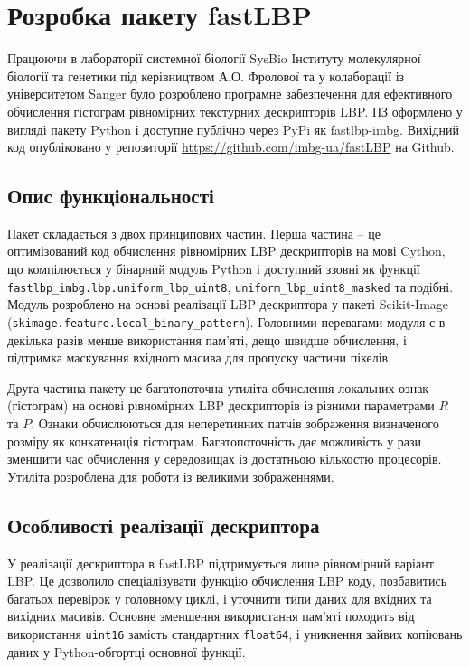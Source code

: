 \section{Розробка пакету fastLBP}\label{section2.2}

Працюючи в лабораторії системної біології SysBio Інституту молекулярної біології та генетики під керівництвом А.О. Фролової 
та у колаборації із університетом Sanger було розроблено програмне забезпечення для ефективного обчислення гістограм 
рівномірних текстурних дескрипторів LBP.
ПЗ оформлено у вигляді пакету Python і доступне публічно через PyPi як \href{https://pypi.org/project/fastlbp-imbg/}{fastlbp-imbg}.
Вихідний код опубліковано у репозиторії \url{https://github.com/imbg-ua/fastLBP} на Github.

\subsection{Опис функціональності}\label{section2.2a}
Пакет складається з двох принципових частин. 
Перша частина -- це оптимізований код обчислення рівномірних LBP дескрипторів на мові Cython, що компілюється у бінарний модуль Python 
і доступний ззовні як функції \verb|fastlbp_imbg.lbp.uniform_lbp_uint8|, \verb|uniform_lbp_uint8_masked| та подібні.
Модуль розроблено на основі реалізації LBP дескриптора у пакеті Scikit-Image (\verb|skimage.feature.local_binary_pattern|).
Головними перевагами модуля є в декілька разів менше використання пам'яті, дещо швидше обчислення, і підтримка маскування вхідного масива для 
пропуску частини пікелів.

Друга частина пакету це багатопоточна утиліта обчислення локальних ознак (гістограм) на основі рівномірних LBP дескрипторів із різними параметрами $R$ та $P$.
Ознаки обчислюються для неперетинних патчів зображення визначеного розміру як конкатенація гістограм.
Багатопоточність дає можливість у рази зменшити час обчислення у середовищах із достатньою кількостю процесорів.
Утиліта розроблена для роботи із великими зображеннями.

\subsection{Особливості реалізації дескриптора}\label{section2.2b}
У реалізації дескриптора в fastLBP підтримується лише рівномірний варіант LBP.
Це дозволило спеціалізувати функцію обчислення LBP коду, позбавитись багатьох перевірок у головному циклі, і уточнити типи даних для вхідних та вихідних масивів.
Основне зменшення використання пам'яті походить від використання \verb|uint16| замість стандартних \verb|float64|, 
і уникнення зайвих копіювань даних у Python-обгортці основної функції.


